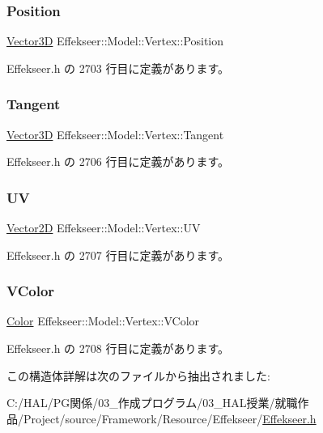 \subsubsection{\texorpdfstring{Position}{Position}}
{\footnotesize\ttfamily \mbox{\hyperlink{struct_effekseer_1_1_vector3_d}{Vector3D}} Effekseer\+::\+Model\+::\+Vertex\+::\+Position}



 Effekseer.\+h の 2703 行目に定義があります。

\mbox{\label{struct_effekseer_1_1_model_1_1_vertex_a5140b60278c5fb4b6d99afbf7966eb1a}} 
\subsubsection{\texorpdfstring{Tangent}{Tangent}}
{\footnotesize\ttfamily \mbox{\hyperlink{struct_effekseer_1_1_vector3_d}{Vector3D}} Effekseer\+::\+Model\+::\+Vertex\+::\+Tangent}



 Effekseer.\+h の 2706 行目に定義があります。

\mbox{\label{struct_effekseer_1_1_model_1_1_vertex_a4b16f6ed12f2a67a6064728c7fe37d7f}} 
\subsubsection{\texorpdfstring{UV}{UV}}
{\footnotesize\ttfamily \mbox{\hyperlink{struct_effekseer_1_1_vector2_d}{Vector2D}} Effekseer\+::\+Model\+::\+Vertex\+::\+UV}



 Effekseer.\+h の 2707 行目に定義があります。

\mbox{\label{struct_effekseer_1_1_model_1_1_vertex_a41a843c2f7d16433de79a01837a91a7f}} 
\subsubsection{\texorpdfstring{V\+Color}{VColor}}
{\footnotesize\ttfamily \mbox{\hyperlink{struct_effekseer_1_1_color}{Color}} Effekseer\+::\+Model\+::\+Vertex\+::\+V\+Color}



 Effekseer.\+h の 2708 行目に定義があります。



この構造体詳解は次のファイルから抽出されました\+:\begin{DoxyCompactItemize}
\item 
C\+:/\+H\+A\+L/\+P\+G関係/03\+\_\+作成プログラム/03\+\_\+\+H\+A\+L授業/就職作品/\+Project/source/\+Framework/\+Resource/\+Effekseer/\mbox{\hyperlink{_effekseer_8h}{Effekseer.\+h}}\end{DoxyCompactItemize}

